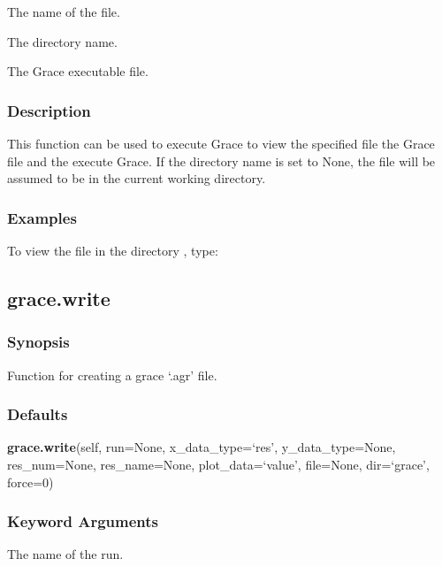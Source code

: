   The name of the file.

  The directory name.

  The Grace executable file.

\subsubsection{Description}

This function can be used to execute Grace to view the specified file the Grace 
 file
and the execute Grace. If the directory name is set to None, the file will be assumed to be
in the current working directory.


\subsubsection{Examples}

To view the file 
 in the directory 
, type:





\newpage

\subsection{grace.write}


\subsubsection{Synopsis}

Function for creating a grace `.agr' file.

\subsubsection{Defaults}

\textsf{\textbf{grace.write}(self, run=None, x\_data\_type=`res', y\_data\_type=None, res\_num=None, res\_name=None, plot\_data=`value', file=None, dir=`grace', force=0)}


\subsubsection{Keyword Arguments}


  The name of the run.

